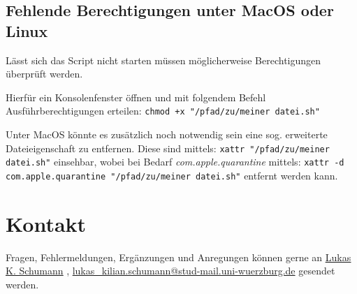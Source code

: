 \documentclass[11pt, a4paper]{article}
\begin{document}
\subsection{Fehlende Berechtigungen unter MacOS oder Linux}
Lässt sich das Script nicht starten müssen möglicherweise Berechtigungen überprüft werden.

Hierfür ein Konsolenfenster öffnen und mit folgendem Befehl Ausführberechtigungen erteilen: \newline\texttt{chmod +x "/pfad/zu/meiner datei.sh"}

Unter MacOS könnte es zusätzlich noch notwendig sein eine sog. erweiterte Dateieigenschaft zu entfernen.
Diese sind mittels:
\newline\texttt{xattr "/pfad/zu/meiner datei.sh"}
\newline einsehbar, wobei bei Bedarf \emph{com.apple.quarantine} mittels:
\newline\texttt{xattr -d com.apple.quarantine "/pfad/zu/meiner datei.sh"}
\newline entfernt werden kann.


\section{Kontakt}

Fragen, Fehlermeldungen, Ergänzungen und Anregungen können gerne an
\newline\underline{\href{mailto:lukas\_kilian.schumann@stud-mail.uni-wuerzburg.de}{Lukas K. Schumann}}
, {\href{mailto:lukas\_kilian.schumann@stud-mail.uni-wuerzburg.de}{lukas\_kilian.schumann@stud-mail.uni-wuerzburg.de}} gesendet werden.
\end{document}
